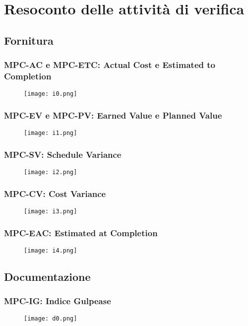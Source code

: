 \section{Resoconto delle attività di verifica}

\subsection{Fornitura}

\subsubsection{MPC-AC e MPC-ETC: Actual Cost e Estimated to Completion}
\begin{figure}[H] \texttt{[image: i0.png]} \end{figure}

\subsubsection{MPC-EV e MPC-PV: Earned Value e Planned Value}
\begin{figure}[H] \texttt{[image: i1.png]} \end{figure}

\subsubsection{MPC-SV: Schedule Variance}
\begin{figure}[H] \texttt{[image: i2.png]} \end{figure}

\subsubsection{MPC-CV: Cost Variance}
\begin{figure}[H] \texttt{[image: i3.png]} \end{figure}

\subsubsection{MPC-EAC: Estimated at Completion}
\begin{figure}[H] \texttt{[image: i4.png]} \end{figure}

\subsection{Documentazione}

\subsubsection{MPC-IG: Indice Gulpease}
\begin{figure}[H] \texttt{[image: d0.png]} \end{figure}


